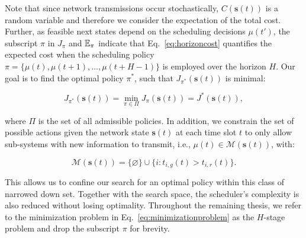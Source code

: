 Note that since network transmissions occur stochastically,
$C(\boldsymbol{s}(t))$ is a random variable and therefore we consider the
expectation of the total cost. Further, as feasible next states depend on the
scheduling decisions $\mu(t')$, the subscript $\pi$ in $J_\pi$ and $\mathbb{E}_\pi$
indicate that Eq.~\eqref{eq:horizoncost} quantifies the expected cost when the
scheduling policy $\pi = \{ \mu(t), {\mu(t+1)}, \dots, \mu(t+H-1) \}$ is
employed over the horizon $H$. Our goal is to find the optimal policy $\pi^*$,
such that $J_{\pi^*}(\boldsymbol{s}(t))$ is minimal:

\begin{equation}
\label{eq:minimizationproblem}
	J_{\pi^*}(\boldsymbol{s}(t)) = \min_{\pi \in \Pi} J_\pi (\boldsymbol{s}(t)) = J^*(\boldsymbol{s}(t)),
\end{equation}

where $\Pi$ is the set of all admissible policies. In addition, we constrain the
set of possible actions given the network state $\boldsymbol{s}(t)$ at each time
slot $t$ to only allow sub-systems with new information to transmit, i.e.,
$\mu(t) \in \mathcal{M}(\boldsymbol{s}(t))$, with:

\begin{equation}
  \label{eq:admissibleactions}
  \mathcal{M}(\boldsymbol{s}(t)) = \{\varnothing\} \cup \{i : t_{i,g}(t) > t_{i,r}(t) \}.
\end{equation}

This allows us to confine our search for an optimal policy within this class of
narrowed down set. Together with the search space, the scheduler's complexity is
also reduced without losing optimality. Throughout the remaining thesis, we
refer to the minimization problem in Eq.~\eqref{eq:minimizationproblem} as the
$H$-stage problem and drop the subscript $\pi$ for brevity.
